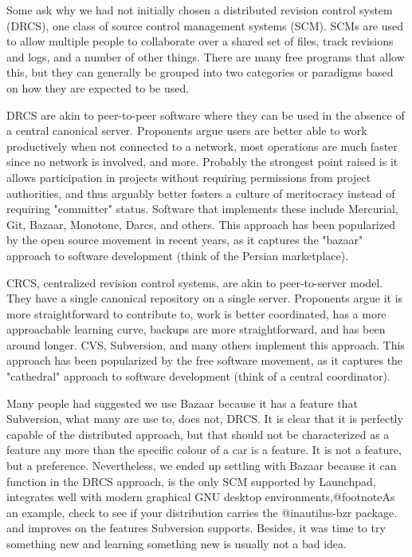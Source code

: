 Some ask why we had not initially chosen a distributed revision control system (DRCS), one class of source control management systems (SCM). SCMs are used to allow multiple people to collaborate over a shared set of files, track revisions and logs, and a number of other things. There are many free programs that allow this, but they can generally be grouped into two categories or paradigms based on how they are expected to be used.

DRCS are akin to peer-to-peer software where they can be used in the absence of a central canonical server. Proponents argue users are better able to work productively when not connected to a network, most operations are much faster since no network is involved, and more. Probably the strongest point raised is it allows participation in projects without requiring permissions from project authorities, and thus arguably better fosters a culture of meritocracy instead of requiring "committer" status. Software that implements these include Mercurial, Git, Bazaar, Monotone, Darcs, and others. This approach has been popularized by the open source movement in recent years, as it captures the "bazaar" approach to software development (think of the Persian marketplace).

CRCS, centralized revision control systems, are akin to peer-to-server model. They have a single canonical repository on a single server. Proponents argue it is more straightforward to contribute to, work is better coordinated, has a more approachable learning curve, backups are more straightforward, and has been around longer. CVS, Subversion, and many others implement this approach. This approach has been popularized by the free software movement, as it captures the "cathedral" approach to software development (think of a central coordinator).

Many people had suggested we use Bazaar because it has a feature that Subversion, what many are use to, does not, DRCS. It is clear that it is perfectly capable of the distributed approach, but that should not be characterized as a feature any more than the specific colour of a car is a feature. It is not a feature, but a preference. Nevertheless, we ended up settling with Bazaar because it can function in the DRCS approach, is the only SCM supported by Launchpad, integrates well with modern graphical GNU desktop environments,@footnote{As an example, check to see if your distribution carries the @i{nautilus-bzr} package.} and improves on the features Subversion supports. Besides, it was time to try something new and learning something new is usually not a bad idea.

